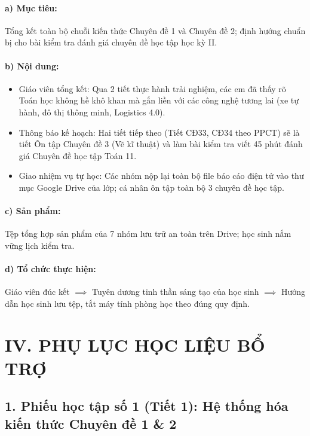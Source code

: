 \documentclass[12pt, a4paper]{article}
\begin{document}
\paragraph{a) Mục tiêu:} Tổng kết toàn bộ chuỗi kiến thức Chuyên đề 1 và Chuyên đề 2; định hướng chuẩn bị cho bài kiểm tra đánh giá chuyên đề học tập học kỳ II.

\paragraph{b) Nội dung:}
\begin{itemize}[leftmargin=0.6cm]
    \item Giáo viên tổng kết: Qua 2 tiết thực hành trải nghiệm, các em đã thấy rõ Toán học không hề khô khan mà gắn liền với các công nghệ tương lai (xe tự hành, đô thị thông minh, Logistics 4.0).
    \item Thông báo kế hoạch: Hai tiết tiếp theo (Tiết CĐ33, CĐ34 theo PPCT) sẽ là tiết Ôn tập Chuyên đề 3 (Vẽ kĩ thuật) và làm bài kiểm tra viết 45 phút đánh giá Chuyên đề học tập Toán 11.
    \item Giao nhiệm vụ tự học: Các nhóm nộp lại toàn bộ file báo cáo điện tử vào thư mục Google Drive của lớp; cá nhân ôn tập toàn bộ 3 chuyên đề học tập.
\end{itemize}

\paragraph{c) Sản phẩm:} Tệp tổng hợp sản phẩm của 7 nhóm lưu trữ an toàn trên Drive; học sinh nắm vững lịch kiểm tra.

\paragraph{d) Tổ chức thực hiện:} Giáo viên đúc kết $\implies$ Tuyên dương tinh thần sáng tạo của học sinh $\implies$ Hướng dẫn học sinh lưu tệp, tắt máy tính phòng học theo đúng quy định.

\section*{IV. PHỤ LỤC HỌC LIỆU BỔ TRỢ}

\subsection*{1. Phiếu học tập số 1 (Tiết 1): Hệ thống hóa kiến thức Chuyên đề 1 \& 2}
\end{document}
